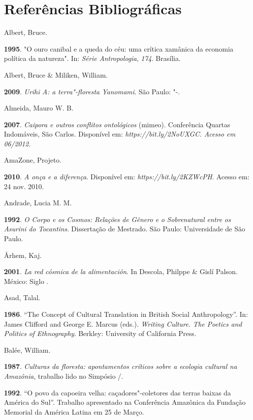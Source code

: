 
\chapter{Referências
Bibliográficas}\label{referuxeancias-bibliogruxe1ficas}


\begin{Parskip}
Albert, Bruce.

\textbf{1995}. "O ouro canibal e a queda do céu: uma crítica xamânica da
economia política da natureza". In: \emph{Série Antropologia},
\emph{174}. Brasília.

Albert, Bruce \& Miliken, William.

\textbf{2009}. \emph{Urihi A: a terra"-floresta Yanomami}. São Paulo:
"-.

Almeida, Mauro W. B.

\textbf{2007}. \emph{Caipora e outros conflitos ontológicos} (mimeo).
Conferência Quartas Indomáveis, São Carlos. Disponível em:
\emph{https://bit.ly/2NoUXGC. Acesso em 06/2012.}

AmaZone, Projeto.

\textbf{2010}. \emph{A onça e a diferença}. Disponível em:
\emph{https://bit.ly/2KZWcPH}.
Acesso em: 24 nov. 2010.

Andrade, Lucia M. M.

\textbf{1992}. \emph{O Corpo e os Cosmos: Relações de Gênero e o
Sobrenatural entre os Asurini do Tocantins}. Dissertação de Mestrado.
São Paulo: Universidade de São Paulo.

Århem, Kaj.

\textbf{2001}. \emph{La red cósmica de la alimentación}. In Descola,
Philppe \& Gislí Palson. México: Siglo .

Asad, Talal.

\textbf{1986}. ``The Concept of Cultural Translation in British Social
Anthropology''. In: James Clifford and George E. Marcus (eds.).
\emph{Writing Culture. The Poetics and Politics of Ethnography}.
Berkley: University of California Press.

Balée, William.

\textbf{1987}. \emph{Culturas da floresta: apontamentos críticos sobre a
ecologia cultural na Amazônia}, trabalho lido no Simpósio /.

\textbf{1992}. ``O povo da capoeira velha: caçadores"-coletores das
terras baixas da América do Sul''. Trabalho apresentado na Conferência
Amazônica da Fundação Memorial da América Latina em 25 de Março.


\end{Parskip}
